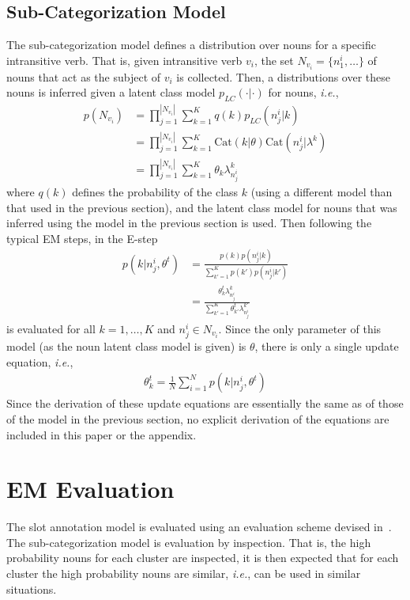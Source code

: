\documentclass[11pt]{scrartcl}
\newcommand{\ie}{\textit{i.e.}}
\newcommand{\Cat}{\text{Cat}}
\begin{document}
\subsection{Sub-Categorization Model} %
\label{sec:nounclasses}
The sub-categorization model defines a distribution over nouns for a
specific intransitive verb. That is, given intransitive verb $v_i$,
the set $N_{v_i} = \{n^i_1, \ldots\}$ of nouns that act as the subject
of $v_i$ is collected. Then, a distributions over these nouns is
inferred given a latent class model $p_{LC}(\cdot|\cdot)$ for nouns, \ie,
\begin{align*}
  p(N_{v_i}) &= \prod_{j=1}^{|N_{v_i}|} \sum_{k=1}^K q(k)p_{LC}(n^i_j|k) \\
            &= \prod_{j=1}^{|N_{v_i}|} \sum_{k=1}^K \Cat(k|\theta)\Cat(n^i_j|\lambda^k) \\
            &= \prod_{j=1}^{|N_{v_i}|} \sum_{k=1}^K \theta_k \lambda^k_{n^i_j}
\end{align*}
where $q(k)$ defines the probability of the class $k$ (using a
different model than that used in the previous section), and the
latent class model for nouns that was inferred using the model in the
previous section is used. Then following the typical EM steps, in the E-step
\begin{align*}
    p(k|n^i_j, \theta^t) &= \frac{p(k)p(n^i_j|k)}{\sum_{k'=1}^K  p(k')p(n^i_j|k')} \\
               &= \frac{\theta^t_{k}\lambda^{k}_{n^i_j}}{\sum_{k'=1}^K  \theta^t_{k'}\lambda^{k'}_{n^i_j}}
\end{align*}
is evaluated for all $k = 1,\ldots,K$ and $n^i_j \in N_{v_i}$. Since
the only parameter of this model (as the noun latent class model is
given) is $\theta$, there is only a single update equation, \ie,
\begin{align*}
  \theta^t_k = \frac{1}{N} \sum_{i=1}^N p(k | n^i_j, \theta^t)
\end{align*}
Since the derivation of these update equations are essentially the
same as of those of the model in the previous section, no explicit
derivation of the equations are included in this paper or the
appendix.

\section{EM Evaluation} %
The slot annotation model is evaluated using an evaluation scheme
devised in~\cite{rooth1999inducing}. The sub-categorization model is
evaluation by inspection. That is, the high probability nouns for each
cluster are inspected, it is then expected that for each cluster the
high probability nouns are similar, \ie, can be used in similar
situations.
\end{document}
